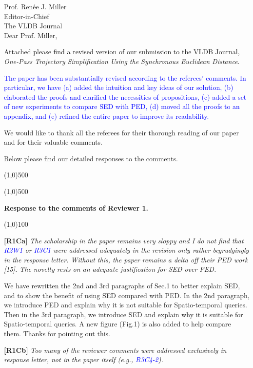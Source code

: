 \documentclass{letter}
\begin{document}
Prof. {Ren{\'{e}}e J. Miller} \\
Editor-in-Chief		\\
The VLDB Journal	\\



Dear Prof. Miller,

Attached please find a revised version of our submission to
the VLDB Journal, \emph{One-Pass Trajectory Simplification Using the Synchronous Euclidean Distance}.


\textcolor{blue}{The paper has been substantially revised according to the referees' comments. In particular, we have (a) added the intuition and key ideas of our solution, (b) elaborated the proofs and clarified the necessities of propositions, (c) added a set of new experiments to compare SED with PED, (d) moved all the proofs to an appendix, and (e) refined the entire paper to improve its readability.}

We would like to thank all the referees for their thorough reading of our paper and for their valuable comments.

Below please find our detailed responses to the comments.


\line(1,0){500}


\line(1,0){500}

\textbf{Response to the comments of Reviewer 1.}

\line(1,0){100}


\textbf{[R1Ca]} \emph{The scholarship in the paper remains very sloppy and I do not find that \textcolor{blue}{R2W1} or \textcolor{blue}{R3C1} were addressed adequately in the revision only rather begrudgingly in the response letter. Without this, the paper remains a delta off their PED work [15]. The novelty rests on an adequate justification for SED over PED.}

We have rewritten the 2nd and 3rd paragraphs of Sec.1 to better explain SED, and to show the benefit of using SED compared with PED. In the 2nd paragraph, we introduce PED and explain why it is not suitable for Spatio-temporal queries. Then in the 3rd paragraph, we introduce SED and explain why it is suitable for Spatio-temporal queries. A new figure (Fig.1) is also added to help compare them. Thanks for pointing out this.


\textbf{[R1Cb]} \emph{Too many of the reviewer comments were addressed exclusively in response letter, not in the paper itself (e.g., \textcolor{blue}{R3C4-2}).}
\end{document}
